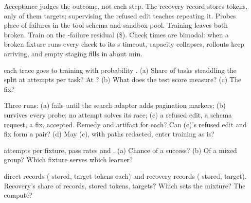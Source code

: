 \documentclass{studysheet}
\begin{document}
\begin{rightcol}
%
  {Acceptance judges the outcome, not each step. The recovery record stores  tokens, only
    of them targets; supervising the refused edit teaches repeating it.}{}
%
  {Probes place  of  failures in the tool schema and sandbox pool. Training leaves
   both broken. Train on the -failure residual (\$).}{}
%
  {Check times are bimodal: when a broken fixture runs every check to its  s timeout, capacity
   collapses, rollouts keep arriving, and empty staging fills in about  min.}{}

\vspace{2pt}
\begin{qs}
\item \assumed{} each trace goes to training with probability . (a) Share of tasks straddling the split
  at  attempts per task? At ? (b) What does the test score measure? (c) The fix?
\item Three runs: (a) fails until the search adapter adds pagination markers; (b) survives every probe; no attempt
  solves its race; (c) a refused edit, a schema request, a fix, accepted. Remedy and artifact for
  each? Can (c)'s refused edit and fix form a pair? (d) May (c), with paths redacted, enter training as is?
\item \assumed{}  attempts per fixture, pass rates  and . (a) Chance of a success?
  (b) Of a mixed group? Which fixture serves which learner?
\item \assumed{}  direct records ( stored,  target tokens each) and  recovery
  records ( stored,  target). Recovery's share of records, stored tokens, targets? Which sets
  the mixture? The compute?
\end{qs}
\end{rightcol}
\end{document}
